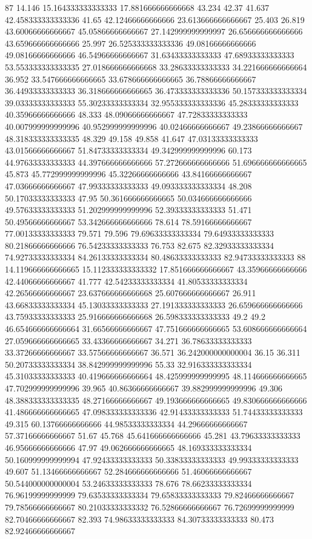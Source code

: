 87 14.146 15.164333333333333 17.881666666666668 43.234 42.37 41.637 42.458333333333336 41.65 42.12466666666666 23.613666666666667 25.403 26.819 43.60066666666667 45.05866666666667 27.142999999999997 26.656666666666666 43.659666666666666 25.997 26.525333333333336 49.08166666666666 49.08166666666666 46.54966666666667 31.63433333333333 47.68933333333333 53.553333333333335 27.018666666666668 33.28633333333333 34.221666666666664 36.952 33.547666666666665 33.678666666666665 36.78866666666667 36.44933333333333 36.318666666666665 36.473333333333336 50.157333333333334 39.03333333333333 55.30233333333334 32.955333333333336 45.28333333333333 40.35966666666666 48.333 48.09066666666667 47.72833333333333 40.007999999999996 40.952999999999996 40.02466666666667 49.23866666666667 48.318333333333335 48.329 49.158 49.858 41.647 47.03133333333333 43.01566666666667 51.84733333333334 49.342999999999996 60.173 44.97633333333333 44.397666666666666 57.272666666666666 51.696666666666665 45.873 45.772999999999996 45.32266666666666 43.84166666666667 47.03666666666667 47.99333333333333 49.093333333333334 48.208 50.17033333333333 47.95 50.361666666666665 50.034666666666666 49.57633333333333 51.202999999999996 52.39333333333333 51.471 50.49566666666667 53.342666666666666 78.614 78.59166666666667 77.00133333333333 79.571 79.596 79.69633333333334 79.64933333333333 80.21866666666666 76.54233333333333 76.753 82.675 82.32933333333334 74.92733333333334 84.26133333333334 80.48633333333333 82.94733333333333
88 14.119666666666665 15.112333333333332 17.851666666666667 43.35966666666666 42.44066666666667 41.777 42.54233333333334 41.80533333333334 42.26566666666667 23.637666666666668 25.607666666666667 26.911 43.66833333333334 45.13033333333333 27.191333333333333 26.659666666666666 43.75933333333333 25.916666666666668 26.598333333333333 49.2 49.2 46.654666666666664 31.66566666666667 47.751666666666665 53.608666666666664 27.059666666666665 33.43366666666667 34.271 36.78633333333333 33.37266666666667 33.57566666666667 36.571 36.242000000000004 36.15 36.311 50.20733333333334 38.842999999999996 55.33 32.916333333333334 45.31033333333333 40.419666666666664 48.425999999999995 48.114666666666665 47.702999999999996 39.965 40.86366666666667 39.882999999999996 49.306 48.388333333333335 48.27166666666667 49.193666666666665 49.830666666666666 41.486666666666665 47.098333333333336 42.91433333333333 51.74433333333333 49.315 60.13766666666666 44.98533333333334 44.29666666666667 57.37166666666667 51.67 45.768 45.641666666666666 45.281 43.79633333333333 46.95666666666666 47.97 49.062666666666665 48.169333333333334 50.160999999999994 47.92433333333333 50.33833333333333 49.99333333333333 49.607 51.13466666666667 52.284666666666666 51.46066666666667 50.544000000000004 53.24633333333333 78.676 78.66233333333334 76.96199999999999 79.63533333333334 79.65833333333333 79.82466666666667 79.78566666666667 80.21033333333332 76.52866666666667 76.72699999999999 82.70466666666667 82.393 74.98633333333333 84.30733333333333 80.473 82.92466666666667
